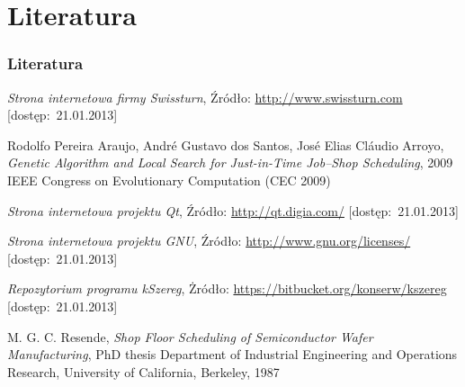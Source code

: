 \documentclass{prezentacja}
\begin{document}
\section{Literatura}
\begin{thebibliography}{1}
\begin{frame}
    \frametitle{Literatura}
    \scriptsize
    
    \emph{Strona internetowa firmy Swissturn},
    Źródło: \url{http://www.swissturn.com} [dostęp:~21.01.2013]

    Rodolfo Pereira Araujo, André Gustavo dos Santos, José Elias Cláudio Arroyo,
    \emph{Genetic Algorithm and Local Search for Just-in-Time Job–Shop Scheduling},
    2009 IEEE Congress on Evolutionary Computation (CEC 2009)

    \emph{Strona internetowa projektu Qt},
    Źródło: \url{http://qt.digia.com/} [dostęp:~21.01.2013]

    \emph{Strona internetowa projektu GNU},
    Źródło: \url{http://www.gnu.org/licenses/} [dostęp:~21.01.2013]

    \emph{Repozytorium programu kSzereg},
    Żródło: \url{https://bitbucket.org/konserw/kszereg} [dostęp:~21.01.2013]

    M. G. C. Resende,  
    \emph{Shop Floor Scheduling of Semiconductor Wafer Manufacturing},
    PhD thesis Department of Industrial Engineering and Operations Research, University of California, Berkeley, 1987 
\end{frame}
\end{thebibliography}
\end{document}

